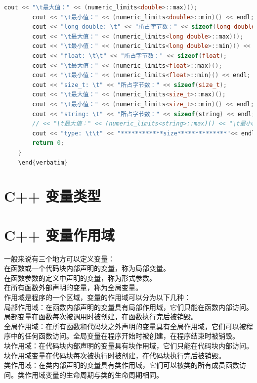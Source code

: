 \documentclass[12pt,twiside,a4paper]{ctexbook}
\numberwithin{chapter}{part}
\begin{document}
\begin{lstlisting}[language=C++]
        cout << "\t最大值：" << (numeric_limits<double>::max)();  
        cout << "\t最小值：" << (numeric_limits<double>::min)() << endl;  
        cout << "long double: \t" << "所占字节数：" << sizeof(long double);  
        cout << "\t最大值：" << (numeric_limits<long double>::max)();  
        cout << "\t最小值：" << (numeric_limits<long double>::min)() << endl;  
        cout << "float: \t\t" << "所占字节数：" << sizeof(float);  
        cout << "\t最大值：" << (numeric_limits<float>::max)();  
        cout << "\t最小值：" << (numeric_limits<float>::min)() << endl;  
        cout << "size_t: \t" << "所占字节数：" << sizeof(size_t);  
        cout << "\t最大值：" << (numeric_limits<size_t>::max)();  
        cout << "\t最小值：" << (numeric_limits<size_t>::min)() << endl;  
        cout << "string: \t" << "所占字节数：" << sizeof(string) << endl;  
        // << "\t最大值：" << (numeric_limits<string>::max)() << "\t最小值：" << (numeric_limits<string>::min)() << endl;  
        cout << "type: \t\t" << "************size**************"<< endl;  
        return 0;  
    }
    \end{verbatim}
\end{lstlisting}


\chapter{C++ 变量类型}

\chapter{C++ 变量作用域}
一般来说有三个地方可以定义变量：\\
在函数或一个代码块内部声明的变量，称为局部变量。\\
在函数参数的定义中声明的变量，称为形式参数。\\
在所有函数外部声明的变量，称为全局变量。\\
作用域是程序的一个区域，变量的作用域可以分为以下几种：\\
局部作用域：在函数内部声明的变量具有局部作用域，它们只能在函数内部访问。局部变量在函数每次被调用时被创建，在函数执行完后被销毁。\\
全局作用域：在所有函数和代码块之外声明的变量具有全局作用域，它们可以被程序中的任何函数访问。全局变量在程序开始时被创建，在程序结束时被销毁。\\
块作用域：在代码块内部声明的变量具有块作用域，它们只能在代码块内部访问。块作用域变量在代码块每次被执行时被创建，在代码块执行完后被销毁。\\
类作用域：在类内部声明的变量具有类作用域，它们可以被类的所有成员函数访问。类作用域变量的生命周期与类的生命周期相同。
\end{document}
